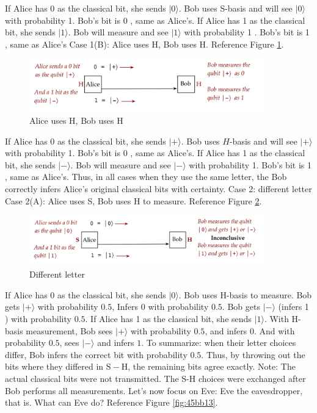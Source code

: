 \documentclass[main.tex]{subfiles}
\begin{document}
    If Alice has 0 as the classical bit, she sends $|0\rangle$. Bob uses S-basis and will see $|0\rangle$ with probability 1. Bob's bit is 0 , same as Alice's. If Alice has 1 as the classical bit, she sends $|1\rangle$. Bob will measure and see $|1\rangle$ with probability 1 . Bob's bit is 1 , same as Alice's Case 1(B): Alice uses H, Bob uses H. Reference Figure \ref{fig:43bb11}.
    
    \begin{figure}
        \centering
        \includegraphics[width=4in]{notes/figs/n05/43bb11.png}
        \caption{Alice uses H, Bob uses H}
        \label{fig:43bb11}
    \end{figure} 
    
    If Alice has 0 as the classical bit, she sends $|+\rangle$. Bob uses $H$-basis and will see $|+\rangle$ with probability 1. Bob's bit is 0 , same as Alice's. If Alice has 1 as the classical bit, she sends $|-\rangle$. Bob will measure and see $|-\rangle$ with probability 1. Bob's bit is 1 , same as Alice's. Thus, in all cases when they use the same letter, the Bob correctly infers Alice's original classical bits with certainty. Case 2: different letter Case 2(A): Alice uses S, Bob uses H to measure. Reference Figure \ref{fig:44bb12}.
    
    \begin{figure}
        \centering
        \includegraphics[width=4in]{notes/figs/n05/44bb12.png}
        \caption{Different letter}
        \label{fig:44bb12}
    \end{figure} 
    
    If Alice has 0 as the classical bit, she sends $|0\rangle$. Bob uses H-basis to measure. Bob gets $|+\rangle$ with probability $0.5$, Infers 0 with probability $0.5$. Bob gets $|-\rangle$ (infers 1 ) with probability $0.5$. If Alice has 1 as the classical bit, she sends $|1\rangle$. With H-basis measurement, Bob sees $|+\rangle$ with probability $0.5$, and infers 0. And with probability $0.5$, sees $|-\rangle$ and infers $1.$ To summarize: when their letter choices differ, Bob infers the correct bit with probability $0.5$. Thus, by throwing out the bits where they differed in $\mathrm{S}-\mathrm{H}$, the remaining bits agree exactly. Note: The actual classical bits were not transmitted. The S-H choices were exchanged after Bob performs all measurements. Let's now focus on Eve: Eve the eavesdropper, that is. What can Eve do? Reference Figure \ref{fig:45bb13}.
    
\end{document}
